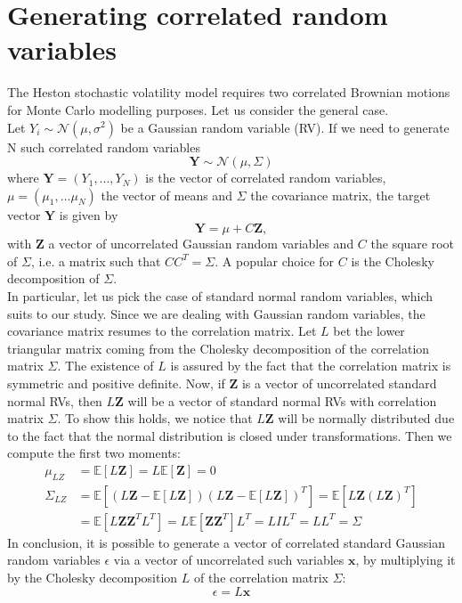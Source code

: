 \documentclass[12pt]{article}
\numberwithin{equation}{section}
\begin{document}
\section{Generating correlated random variables}
The Heston stochastic volatility model requires two correlated Brownian motions for Monte Carlo modelling purposes. Let us consider the general case.\\
\newline
Let $Y_i \sim \mathcal{N}(\mu,\sigma^2)$ be a Gaussian random variable (RV). If we need to generate N such correlated random variables
\begin{equation*}
\textbf{Y} \sim \mathcal{N} (\mu, \Sigma)
\end{equation*}  
where $\textbf{Y}=(Y_1,...,Y_N)$ is the vector of correlated random variables, $\mu = (\mu_1,...\mu_N)$ the vector of means and $\Sigma$ the covariance matrix, the target vector $\textbf{Y}$ is given by
\begin{equation*}
\textbf{Y} = \mu + C\textbf{Z},
\end{equation*} 
with $\textbf{Z}$ a vector of uncorrelated Gaussian random variables and $C$ the square root of $\Sigma$, i.e. a matrix such that $CC^T=\Sigma$. A popular choice for $C$ is the Cholesky decomposition of $\Sigma$.\\
\newline
In particular, let us pick the case of standard normal random variables, which suits to our study. Since we are dealing with Gaussian random variables, the covariance matrix resumes to the correlation matrix. Let $L$ bet the lower triangular matrix coming from the Cholesky decomposition of the correlation matrix $\Sigma$. The existence of $L$ is assured by the fact that the correlation matrix is symmetric and positive definite. Now, if $\textbf{Z}$ is a vector of uncorrelated standard normal RVs, then $L\textbf{Z}$ will be a vector of standard normal RVs with correlation matrix $\Sigma$. To show this holds, we notice that $L\textbf{Z}$ will be normally distributed due to the fact that the normal distribution is closed under transformations. Then we compute the   first two moments:
\begin{align*}
\mu_{LZ} 	&= \mathbb{E}[L\textbf{Z}] = L\mathbb{E}[\textbf{Z}] = 0 \\
\Sigma_{LZ} 	&= \mathbb{E}[ (L\textbf{Z} - \mathbb{E}[L\textbf{Z}]) (L\textbf{Z} - \mathbb{E}[L\textbf{Z}])^T ] = \mathbb{E}[L\textbf{Z}(L\textbf{Z})^T] \\
&= \mathbb{E}[L\textbf{Z}\textbf{Z}^TL^T] = L \mathbb{E}[\textbf{ZZ}^T] L^T = LIL^T = LL^T = \Sigma 
\end{align*}
In conclusion, it is possible to generate a vector of correlated standard Gaussian random variables \textbf{$\epsilon$} via a vector of uncorrelated such variables $\textbf{x}$, by multiplying it by the Cholesky decomposition $L$ of the correlation matrix $\Sigma$:
\begin{equation*}
\epsilon = L \textbf{x}
\end{equation*}
\end{document}
